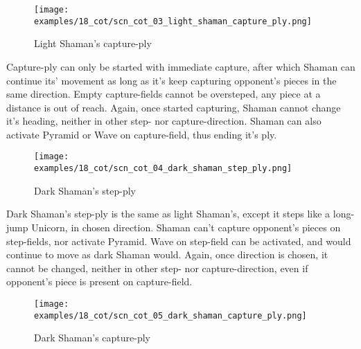 \clearpage %

\noindent
\begin{figure}[!h]
\texttt{[image: examples/18\_cot/scn\_cot\_03\_light\_shaman\_capture\_ply.png]}
\caption{Light Shaman's capture-ply}
\label{fig:scn_cot_03_light_shaman_capture_ply}
\end{figure}

Capture-ply can only be started with immediate capture, after which Shaman
can continue its' movement as long as it's keep capturing opponent's pieces
in the same direction. Empty capture-fields cannot be oversteped, any piece
at a distance is out of reach. Again, once started capturing, Shaman cannot
change it's heading, neither in other step- nor capture-direction. Shaman
can also activate Pyramid or Wave on capture-field, thus ending it's ply.

\clearpage %

\noindent
\begin{figure}[!h]
\texttt{[image: examples/18\_cot/scn\_cot\_04\_dark\_shaman\_step\_ply.png]}
\caption{Dark Shaman's step-ply}
\label{fig:scn_cot_04_dark_shaman_step_ply}
\end{figure}

Dark Shaman's step-ply is the same as light Shaman's, except it steps like a
long-jump Unicorn, in chosen direction. Shaman can't capture opponent's pieces
on step-fields, nor activate Pyramid. Wave on step-field can be activated, and
would continue to move as dark Shaman would. Again, once direction is chosen,
it cannot be changed, neither in other step- nor capture-direction, even if
opponent's piece is present on capture-field.

\clearpage %

\noindent
\begin{figure}[!h]
\texttt{[image: examples/18\_cot/scn\_cot\_05\_dark\_shaman\_capture\_ply.png]}
\caption{Dark Shaman's capture-ply}
\label{fig:scn_cot_05_dark_shaman_capture_ply}
\end{figure}

